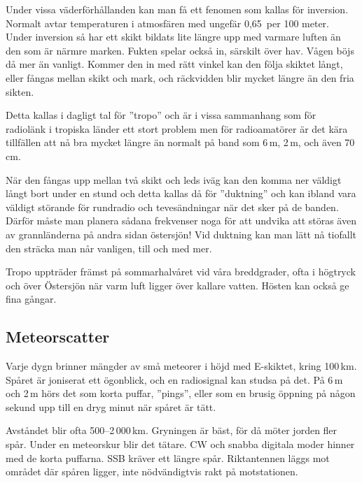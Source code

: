 Under vissa väderförhållanden kan man få ett fenomen som kallas för
inversion.  Normalt avtar temperaturen i atmosfären med ungefär
0,65\textdegree\ per 100 meter. Under inversion så har ett skikt
bildats lite längre upp med varmare luften än den som är närmre
marken. Fukten spelar också in, särskilt över hav. Vågen böjs då mer
än vanligt. Kommer den in med rätt vinkel kan den följa skiktet långt,
eller fångas mellan skikt och mark, och räckvidden blir mycket längre
än den fria sikten.

Detta kallas i dagligt tal för ''tropo'' och är i vissa sammanhang som
för radiolänk i tropiska länder ett stort problem men för
radioamatörer är det kära tillfällen att nå bra mycket längre än
normalt på band som 6\,m, 2\,m, och även 70\,cm.

När den fångas upp mellan två skikt och leds iväg kan den komma ner
väldigt långt bort under en stund och detta kallas då för ''duktning''
och kan ibland vara väldigt störande för rundradio och tevesändningar
när det sker på de banden. Därför måste man planera sådana frekvenser
noga för att undvika att störas även av grannländerna på andra sidan
östersjön! Vid duktning kan man lätt nå tiofallt den sträcka man når
vanligen, till och med mer.

Tropo uppträder främst på sommarhalvåret vid våra breddgrader, ofta i
högtryck och över Östersjön när varm luft ligger över kallare
vatten. Hösten kan också ge fina gångar.

\subsection{Meteorscatter}

Varje dygn brinner mängder av små meteorer i höjd med E-skiktet, kring
100\,km. Spåret är joniserat ett ögonblick, och en radiosignal kan
studsa på det. På 6\,m och 2\,m hörs det som korta puffar, ''pings'',
eller som en brusig öppning på någon sekund upp till en dryg minut när
spåret är tätt.

Avståndet blir ofta 500--2\,000\,km. Gryningen är bäst, för då möter
jorden fler spår. Under en meteorskur blir det tätare. CW och snabba
digitala moder hinner med de korta puffarna. SSB kräver ett längre
spår. Riktantennen läggs mot området där spåren ligger, inte
nödvändigtvis rakt på motstationen.

